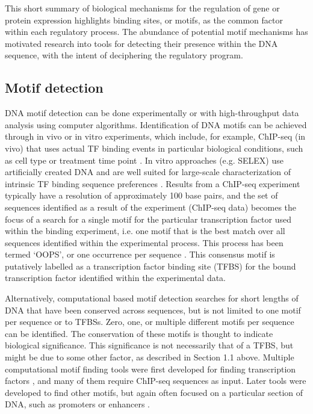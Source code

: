 \documentclass[12pt]{article}
\begin{document}
This short summary of biological mechanisms for the regulation of gene or protein expression highlights binding sites, or motifs, as the common factor within each regulatory process. The abundance of potential motif mechanisms has motivated research into tools for detecting their presence within the DNA sequence, with the intent of deciphering the regulatory program. 

\subsection{Motif detection}
DNA motif detection can be done experimentally or with high-throughput data analysis using computer algorithms. Identification of DNA motifs can be achieved through in vivo or in vitro experiments, which include, for example, ChIP-seq (in vivo) that uses actual TF binding events in particular biological conditions, such as cell type or treatment time point \citep{inukai2017transcription}. In vitro approaches (e.g. SELEX) use artificially created DNA and are well suited for large-scale characterization of intrinsic TF binding sequence preferences \citep{inukai2017transcription}.  Results from a ChIP-seq experiment typically have a resolution of approximately 100 base pairs, and the set of sequences identified as a result of the experiment (ChIP-seq data) becomes the focus of a search for a single motif for the particular transcription factor used within the binding experiment, i.e. one motif that is the best match over all sequences identified within the experimental process. This process has been termed `OOPS', or one occurrence per sequence \citep{zhang2016entropy}. This consensus motif is putatively labelled as a transcription factor binding site (TFBS) for the bound transcription factor identified within the experimental data. 

Alternatively, computational based motif detection searches for short lengths of DNA that have been conserved across sequences, but is not limited to one motif per sequence or to TFBSs. Zero, one, or multiple different motifs per sequence can be identified. The conservation of these motifs is thought to indicate biological significance. This significance is not necessarily that of a TFBS, but might be due to some other factor, as described in Section 1.1 above. 
Multiple computational motif finding tools were first developed for finding transcription factors \citep{dassi2016dynamit}, and many of them require ChIP-seq sequences as input. Later tools were developed to find other motifs, but again often focused on a particular section of DNA, such as promoters or enhancers  \citep{boeva2016analysis}.
\end{document}

